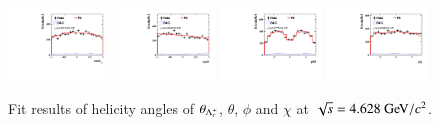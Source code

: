 \begin{figure}[H]\centering
    \includegraphics[width=0.24\textwidth]{figure/polarimetery/angular_plots/pkpi_4626_cos_theta0.pdf}
    \includegraphics[width=0.24\textwidth]{figure/polarimetery/angular_plots/pkpi_4626_cos_theta1.pdf}
    \includegraphics[width=0.24\textwidth]{figure/polarimetery/angular_plots/pkpi_4626_phi1.pdf}
    \includegraphics[width=0.24\textwidth]{figure/polarimetery/angular_plots/pkpi_4626_phi2.pdf}
    \caption{Fit results of helicity angles of $\theta_{\Lambda_{c}^{+}}$, $\theta$, $\phi$ and $\chi$ at $\sqrt{s} = 4.628\gev/c^2$.}
\label{fig:fit_angular_s2}
\end{figure}

